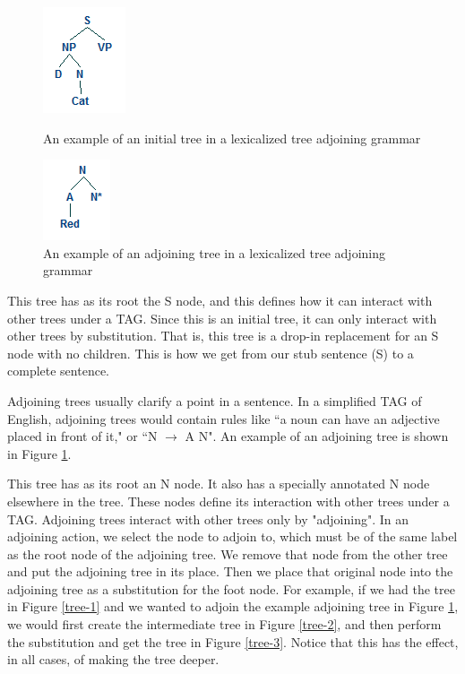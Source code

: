 \begin{figure}[ht]
\centering
\begin{minipage}[b]{0.45\linewidth}
\centering
\includegraphics{initial-example.png}
\caption{An example of an initial tree in a lexicalized tree adjoining grammar}
\label{initial-tree-example}
\end{minipage}
\quad
\begin{minipage}[b]{0.45\linewidth}
\centering
\includegraphics{adjoining-tree-example.png}
\caption{An example of an adjoining tree in a lexicalized tree adjoining grammar}
\label{adjoining-tree-example}
\end{minipage}
\end{figure}

This tree has as its root the S node, and this defines how it can interact with other
trees under a TAG.  Since this is an initial tree, it can only interact with other trees by
substitution.  That is, this tree is a drop-in replacement for an S node with no children.
This is how we get from our stub sentence (S) to a complete sentence.

Adjoining trees usually clarify a point in a sentence.  In a simplified TAG of English, adjoining
trees would contain rules like ``a noun can have an adjective placed in front of it," or ``N $\rightarrow$ A N".
An example of an adjoining tree is shown in Figure \ref{adjoining-tree-example}.

This tree has as its root an N node.  It also has a specially annotated N node elsewhere in the
tree.  These nodes define its interaction with other trees under a TAG.  Adjoining trees interact
with other trees only by "adjoining".  In an adjoining action, we select the node
to adjoin to, which must be of the same label as the root node of the adjoining tree.  We remove
that node from the other tree and put the adjoining tree in its place.  Then
we place that original node into the adjoining tree as a substitution for the foot node.
For example, if we had the tree in Figure \ref{tree-1} and we wanted to adjoin the example adjoining tree
in Figure \ref{adjoining-tree-example}, we would first create the intermediate tree in Figure \ref{tree-2},
and then perform the substitution and get the tree in Figure \ref{tree-3}.  Notice that this has the effect,
in all cases, of making the tree deeper.

